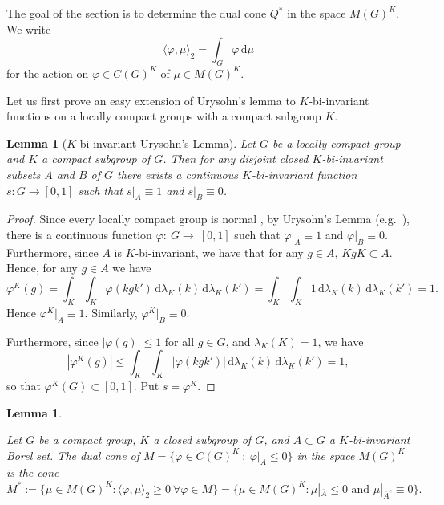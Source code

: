 \documentclass[[a4paper,english,12pt]{amsart}
\theoremstyle{plain}
\newtheorem{lemma}[theorem]{Lemma}
\theoremstyle{remark}
\newcommand{\ff}{\varphi}
\begin{document}
The goal of the section is to determine the dual cone $Q^*$ in the space $M(G)^K$.  We write
$$
\langle \varphi, \mu \rangle_2 = \int_{G} \varphi \,\mbox{d}\mu
$$
for the action on $\varphi \in C(G)^K$ of $\mu \in M(G)^K$. 
 
Let us first prove an easy extension of Urysohn's lemma to $K$-bi-invariant functions on a locally compact groups with a compact subgroup $K$.

\begin{lemma}[$K$-bi-invariant Urysohn's Lemma]\label{inv_urysohn} Let $G$ be a locally compact group and $K$ a compact subgroup of $G$. Then for any disjoint closed $K$-bi-invariant subsets $A$ and $B$ of $G$ there exists a continuous $K$-bi-invariant function $s:G \to [0,1]$ such that $s{|}_A\equiv 1$ and $s|_{B} \equiv 0$.
\end{lemma}

\begin{proof}
Since every locally compact group is normal \cite[Chapter IV, Theorem 1]{husain}, by Urysohn's Lemma (e.g.~\cite[Theorem~7.2.5]{Richmond}), there is a continuous function $\ff: ~G \to~ [0,1]$ such that $\ff|_{A} \equiv 1$ and $\ff|_{B} \equiv 0$. Furthermore, since $A$ is $K$-bi-invariant, we have that for any $g \in A$, $KgK \subset A$. Hence, for any $g \in A$ we have
\begin{equation*}
    \ff^{K}(g)= \int_{K}\int_{K} \ff(kgk') \,\mbox{d}\lambda_{K}(k) \,\mbox{d}\lambda_{K}(k') = \int_{K}\int_{K} 1 \,\mbox{d}\lambda_{K}(k) \,\mbox{d}\lambda_{K}(k') = 1.
\end{equation*}
Hence \(\ff^K|_{A} \equiv 1\). Similarly, \(\ff^K|_{B} \equiv 0\).

Furthermore, since $|\ff(g)| \le 1$ for all $g \in G$, and $\lambda_{K}(K) = 1$, we have 
\begin{equation*}
    |\ff^{K}(g)| \le \int_{K}\int_{K} |\ff(kgk')| \,\mbox{d}\lambda_{K}(k) \,\mbox{d}\lambda_{K}(k') = 1,
\end{equation*}
so that $\ff^{K}(G) \subset  [0,1]$.
Put $s = \ff^{K}$.
\end{proof}

\begin{lemma} \label{lemma:K-polar}

Let $G$ be a compact group, $K$ a closed subgroup of $G$, and $A \subset G$ a $K$-bi-invariant Borel set. The dual cone of $M = \{ \ff \in C(G)^K~:~ \ff|_A \le 0\}$ in the space $M(G)^K$ is the cone
\begin{equation}\label{eq:K-polar}
M^* := \{ \mu \in M(G)^K :  \langle \ff, \mu \rangle_2 \ge 0  \ \forall \ff \in M\} 
= \{ \mu \in M(G)^K :  \mu|_{\overline{A}} \le 0 \text{ and } \mu|_{\overline{A}^c}\equiv 0 \}. 
\end{equation}

\end{lemma}
\end{document}
